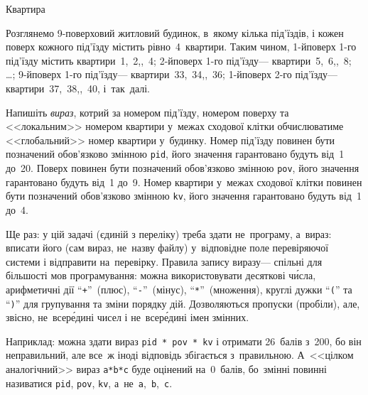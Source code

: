 {

\PrintEjudgeConstraintsfalse

\begin{problemAllDefault}{Квартира}

Розглянемо \mbox{9-по}\-вер\-ховий житловий будинок, в~якому кілька під'їздів, 
і кожен поверх кожного під'їзду містить рівно~4~квартири. Таким чином, 
\mbox{1-й}\nolinebreak[3] поверх \mbox{1-го} під'їзду містить квартири \textnumero\textnumero$\,$1,~2,,~4;\hspace{0.5em plus 0.5em}
\mbox{2-й}\nolinebreak[3] поверх \mbox{1-го} під'їзду\nolinebreak[3] --- квартири \textnumero\textnumero$\,$5,~6,,~8;\hspace{0.25em plus 0.25em}
\dots;\hspace{0.5em plus 0.5em}
\mbox{9-й}\nolinebreak[3] поверх \mbox{1-го} під'їзду\nolinebreak[3] --- квартири \textnumero\textnumero$\,$33,~34,,~36;\hspace{0.5em plus 0.5em}
\mbox{1-й}\nolinebreak[3] поверх \mbox{2-го} під'їзду\nolinebreak[3] --- квартири \textnumero\textnumero$\,$37,~38,,~40,
і~так~далі.

Напишіть \emph{вираз}, котрий за номером під'їзду, номером поверху та <<локальним>> номером квартири у~межах сходової клітки обчислюватиме <<глобальний>> номер квартири у~будинку.
%
Номер під'їзду повинен бути позначений обов'язково змінною \texttt{pid}, його значення гарантовано будуть від~1 до~20.
Поверх повинен бути позначений обов'язково змінною \texttt{pov}, його значення гарантовано будуть від~1 до~9.
Номер квартири у~межах сходової клітки повинен бути позначений обов'язково змінною \texttt{kv}, його значення гарантовано будуть від~1 до~4.

Ще раз: у цій задачі (єдиній з переліку) треба здати не~програму, а~вираз: 
вписати його (сам вираз, не~назву файлу) у~відповідне поле перевіряючої системи
і відправити на~перевірку. Правила запису виразу\nolinebreak[3] --- 
спільні для більшості мов програмування:
можна використовувати десяткові ч\'{и}сла, арифметичні дії ``\verb"+"''~(плюс), 
``\verb"-"''~(мінус), ``\verb"*"''~(множення), круглі дужки ``\verb"("'' та ``\verb")"'' 
для групування та зміни порядку дій. Дозволяються пропуски (пробіли), 
але, звісно, не~всер\'{е}дині чисел і не~всер\'{е}дині імен змінних.

Наприклад: можна здати вираз \verb"pid * pov * kv" і отримати 26~балів з~200, бо він неправильний, 
але все~ж іноді відповідь збігається з~правильною. 
А~<<цілком аналогічний>> вираз \verb"a*b*c" буде оцінений на~0~балів, 
бо~змінні повинні називатися  \verb"pid", \verb"pov", \verb"kv", а~не~\verb"a",~\verb"b",~\verb"c".

\end{problemAllDefault}

}